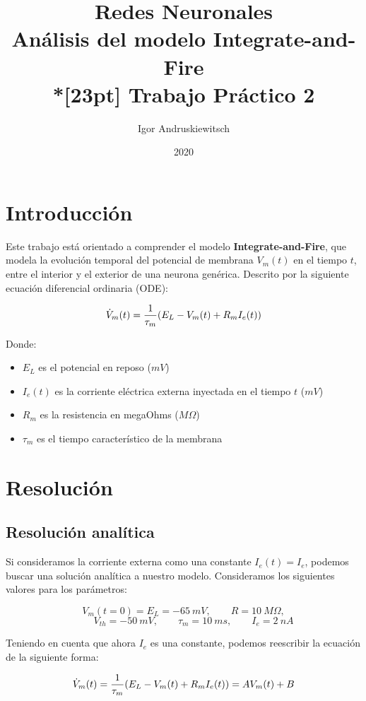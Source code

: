 \documentclass [a4paper,12pt,oneside,final]{article}
\title{%
Redes Neuronales \\
Análisis del modelo Integrate-and-Fire \\*[23pt]
Trabajo Práctico 2 \\
}
\date{2020}
\author{Igor Andruskiewitsch}
\begin{document}
    \maketitle

\section{Introducción}

Este trabajo está orientado a comprender el modelo {\bf Integrate-and-Fire}, que modela la evolución temporal del potencial de membrana $ V_m(t) $ en el tiempo $ t $, entre el interior y el exterior de una neurona genérica. Descrito por la siguiente ecuación diferencial ordinaria (ODE):

\[ \dot{V}_m(t) = {1 \over \tau_m} (E_L - V_m(t) + R_m I_e(t)) \]

Donde:

\begin{itemize}
    \item {$ E_L $ es el potencial en reposo ($mV$) }
    \item {$ I_e(t) $ es la corriente eléctrica externa inyectada en el tiempo $ t $ ($mV$) }
    \item {$ R_m $ es la resistencia en megaOhms ($ M\Omega $) }
    \item {$ \tau_m $ es el tiempo característico de la membrana }
\end{itemize}

\section{Resolución}

\subsection{Resolución analítica}

Si consideramos la corriente externa como una constante $ I_e(t) = I_e $, podemos buscar una solución analítica a nuestro modelo. Consideramos los siguientes valores para los parámetros:

\[ V_m(t = 0) = E_L = -65 \ mV, \qquad R = 10 \ M\Omega, \]
\[ \qquad V_{th} = -50 \  mV, \qquad \tau_m = 10 \ ms, \qquad I_e = 2 \  nA \]

Teniendo en cuenta que ahora $ I_e $ es una constante, podemos reescribir la ecuación de la siguiente forma:

\[ \dot{V}_m(t) = {1 \over \tau_m} (E_L - V_m(t) + R_m I_e(t)) = A V_m(t) + B \]
\end{document}
